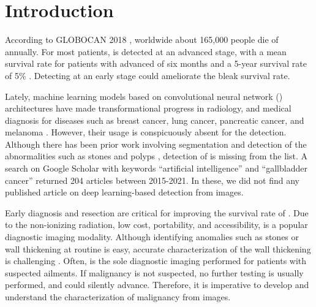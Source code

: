 
\section{Introduction}
%
According to GLOBOCAN 2018 \cite{bray2018global}, worldwide about 165,000 people die of \gbc annually. For most patients, \gbc is detected at an advanced stage, with a mean survival rate for patients with advanced \gbc of six months and a 5-year survival rate of 5\% \cite{randi2006gallbladder, gupta2021locally}. Detecting \gbc at an early stage could ameliorate the bleak survival rate. 

Lately, machine learning models based on convolutional neural network (\cnn) architectures have made transformational progress in radiology, and medical diagnosis for diseases such as breast cancer, lung cancer, pancreatic cancer, and melanoma \cite{ardila2019end, bejnordi2017diagnostic, chu2019application, codella2017deep, han2017breast}. However, their usage is conspicuously absent for the \gbc detection. Although there has been prior work involving segmentation and detection of the \gb abnormalities such as stones and polyps \cite{gbPolyp, gbPolyp2, gbAutomatic}, detection of \gbc is missing from the list. A search on Google Scholar with keywords ``artificial intelligence'' and ``gallbladder cancer'' returned 204 articles between 2015-2021. In these, we did not find any published article on deep learning-based \gbc detection from \usg images.

 
Early diagnosis and resection are critical for improving the survival rate of \gbc. Due to the non-ionizing radiation, low cost, portability, and accessibility, \usg is a popular diagnostic imaging modality. Although identifying anomalies such as stones or \gb wall thickening at routine \usg is easy, accurate characterization of the wall thickening is challenging \cite{gupta2020imaging, gb-rads-paper}. Often, \usg is the sole diagnostic imaging performed for patients with suspected \gb ailments. If malignancy is not suspected, no further testing is usually performed, and \gbc could silently advance. Therefore, it is imperative to develop and understand the characterization of \gb malignancy from \usg images.

